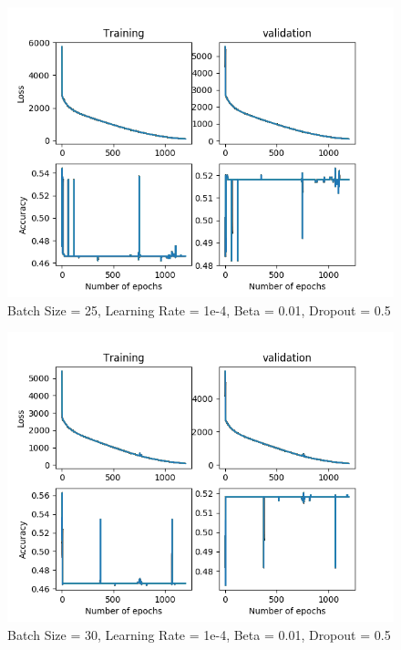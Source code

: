 \documentclass[12pt,reqno]{amsart}
\numberwithin{equation}{section}
\begin{document}
\begin{enumerate}
\begin{figure}[H]
\centering
\includegraphics[scale=0.6]{data12-1e-4-25-1e-2-5e-1}
\caption{Batch Size = 25, Learning Rate = 1e-4, Beta = 0.01, Dropout = 0.5}
\end{figure}

\begin{figure}[H]
\centering
\includegraphics[scale=0.6]{data12-1e-4-30-1e-2-5e-1}
\caption{Batch Size = 30, Learning Rate = 1e-4, Beta = 0.01, Dropout = 0.5}
\end{figure}


\end{enumerate}
\end{document}
